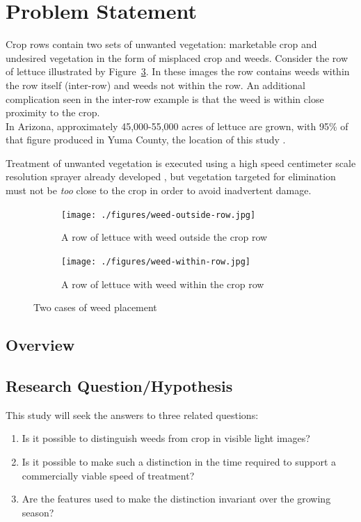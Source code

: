 \documentclass[12pt]{article}
\begin{document}
 \newpage

%
%
 
\section{Problem Statement}
Crop rows contain two sets of unwanted vegetation: marketable crop and undesired vegetation in the form of misplaced crop and weeds. Consider the row of lettuce illustrated by Figure~\ref{fig:weed-placement}. In these images the row contains weeds within the row itself (inter-row) and weeds not within the row. An additional complication seen in the inter-row example is that the weed is within close proximity to the crop. \\
In Arizona, approximately 45,000-55,000 acres of lettuce are grown, with 95\% of that figure produced in Yuma County, the location of this study \parencite{Kerns1999-la}.

Treatment of unwanted vegetation is executed using a high speed centimeter scale resolution sprayer already developed \parencite{Siemens2020-ds}, but vegetation targeted for elimination must not be \textit{too} close to the crop in order to avoid inadvertent damage.

\begin{figure}[H]
	\centering
	\begin{subfigure}[]{.40\textwidth}
		\texttt{[image: ./figures/weed-outside-row.jpg]}
		\caption{A row of lettuce with weed outside the crop row}
		\label{fig:lettuce-row-with-weed-outside}
	\end{subfigure}
	\begin{subfigure}{.40\textwidth}
		\centering
		\texttt{[image: ./figures/weed-within-row.jpg]}
		\caption{A row of lettuce with weed within the crop row}
		\label{fig:lettuce-row-with-weed-inside}
	\end{subfigure}
	\caption[Two cases of weed placement]{Two cases of weed placement}
	\label{fig:weed-placement}
\end{figure}


\subsection{Overview}

\subsection{Research Question/Hypothesis}
This study will seek the answers to three related questions:
\begin{enumerate}
\item{Is it possible to distinguish weeds from crop in visible light images?}
\item{Is it possible to make such a distinction in the time required to support a commercially viable speed of treatment?}
\item{Are the features used to make the distinction invariant over the growing season?}
\end{enumerate}
\end{document}
